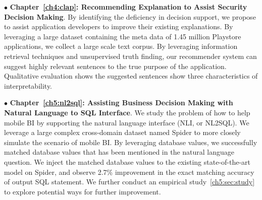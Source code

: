 $\bullet$ \textbf{Chapter~\ref{ch4:clap}: Recommending Explanation to Assist Security Decision Making}. By identifying the deficiency in decision support, we propose to assist application developers to improve their existing explanations. By leveraging a large dataset containing the meta data of 1.45 million Playstore applications, we collect a large scale text corpus. By leveraging information retrieval techniques and unsupervised truth finding, our recommender system can suggest highly relevant sentences to the true purpose of the application. Qualitative evaluation shows the suggested sentences show three characteristics of interpretability. 

$\bullet$ \textbf{Chapter~\ref{ch5:nl2sql}: Assisting Business Decision Making with Natural Language to SQL Interface}. We study the problem of how to help mobile BI by supporting the natural language interface (NLI, or NL2SQL). We leverage a large complex cross-domain dataset named Spider to more closely simulate the scenario of mobile BI. By leveraging database values, we successfully matched database values that has been mentioned in the natural language question. We inject the matched database values to the existing state-of-the-art model on Spider, and observe 2.7\% improvement in the exact matching accuracy of output SQL statement. We further conduct an empirical study~\ref{ch5:sec:study} to explore potential ways for further improvement. 
